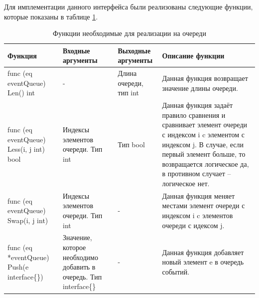 Для имплементации данного интерфейса были реализованы следующие функции, которые показаны в таблице \ref{tab:queue}. 

\begin{table}[]
	\centering
	\caption{Функции необходимые для реализации на очереди}
	\label{tab:queue}
	\begin{tabularx}{\textwidth}{|X|X|X|X|}
		\hline
		Функция                                      & Входные аргументы                                                          & Выходные аргументы                              & Описание функции                                                                                                                                                                                                         \\ \hline
		func (eq eventQueue) Len() int               & -                                                                          & Длина очереди, тип int                          & Данная функция возвращает значение длины очереди.                                                                                                                                                                        \\ \hline
		func (eq eventQueue) Less(i, j int) bool     & Индексы элементов очереди. Тип int                                         & Тип bool                                        & Данная функция задаёт правило сравнения и  сравнивает элемент очереди с индексом i c элементом с индексом j. В случае, если первый элемент больше, то возвращается логическое да, в противном случает -- логическое нет. \\ \hline
		func (eq eventQueue) Swap(i, j int)          & Индексы элементов очереди. Тип int                                         & -                                               & Данная функция меняет местами элемент очереди с индексом i c элементов очереди с идексом j.                                                                                                                              \\ \hline
		func (eq *eventQueue) Push(e interface\{\})  & Значение, которое необходимо добавить в очередь. Тип interface\{\}         & -                                               & Данная функция добавляет новый элемент e в очередь событий.                                                                                                                                                              \\ \hline

\end{tabularx}
\end{table}
